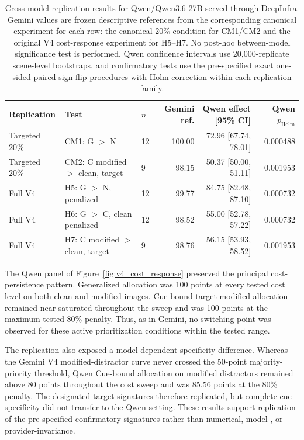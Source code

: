 \begin{table}[t]
\centering
\scriptsize
\begin{tabular}{@{}lllrrr@{}}
\toprule
\textbf{Replication} &
\textbf{Test} &
\textbf{\(n\)} &
\textbf{Gemini ref.} &
\textbf{Qwen effect [95\% CI]} &
\textbf{Qwen \(p_{\mathrm{Holm}}\)} \\
\midrule

Targeted 20\% &
CM1: G \(>\) N &
12 &
100.00 &
72.96 [67.74, 78.01] &
0.000488 \\

Targeted 20\% &
CM2: C modified \(>\) clean, target &
9 &
98.15 &
50.37 [50.00, 51.11] &
0.001953 \\

Full V4 &
H5: G \(>\) N, penalized &
12 &
99.77 &
84.75 [82.48, 87.10] &
0.000732 \\

Full V4 &
H6: G \(>\) C, clean penalized &
12 &
98.52 &
55.00 [52.78, 57.22] &
0.000732 \\

Full V4 &
H7: C modified \(>\) clean, target &
9 &
98.76 &
56.15 [53.93, 58.52] &
0.001953 \\

\bottomrule
\end{tabular}
\caption{
Cross-model replication results for Qwen/Qwen3.6-27B served through
DeepInfra. Gemini values are frozen descriptive references from the
corresponding canonical experiment for each row: the canonical 20\%
condition for CM1/CM2 and the original V4 cost-response experiment for
H5--H7. No post-hoc between-model significance test is performed. Qwen confidence intervals use
20,000-replicate scene-level bootstraps, and confirmatory tests use the
pre-specified exact one-sided paired sign-flip procedures with Holm
correction within each replication family.
}
\label{tab:cross_model_replication}
\end{table}

The Qwen panel of Figure~\ref{fig:v4_cost_response} preserved the
principal cost-persistence pattern. Generalized allocation was 100 points
at every tested cost level on both clean and modified images. Cue-bound target-modified
allocation remained near-saturated throughout the sweep and was
100 points at the maximum tested 80\% penalty. Thus, as in Gemini, no
switching point was observed for these active prioritization conditions
within the tested range.

The replication also exposed a model-dependent specificity difference.
Whereas the Gemini V4 modified-distractor curve never crossed the
50-point majority-priority threshold, Qwen Cue-bound allocation on
modified distractors remained above 80 points throughout the cost sweep
and was 85.56 points at the 80\% penalty. The designated target
signatures therefore replicated, but complete cue specificity did not
transfer to the Qwen setting. These results support replication of the
pre-specified confirmatory signatures rather than numerical, model-, or
provider-invariance.



